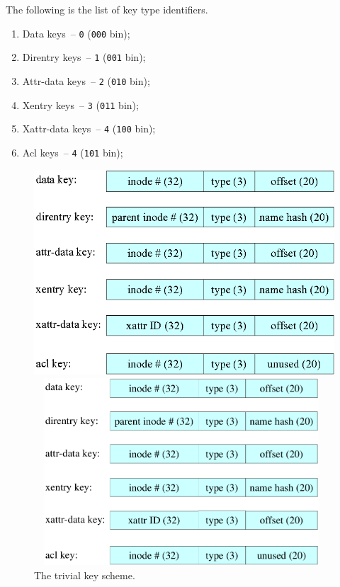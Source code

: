 The following is the list of key type identifiers.

\begin{enumerate}

\item Data keys~-- \texttt{0} (\texttt{000} bin);
\item Direntry keys~-- \texttt{1} (\texttt{001} bin);
\item Attr-data keys~-- \texttt{2} (\texttt{010} bin);
\item Xentry keys~-- \texttt{3} (\texttt{011} bin);
\item Xattr-data keys~-- \texttt{4} (\texttt{100} bin);
\item Acl keys~-- \texttt{4} (\texttt{101} bin);

\end{enumerate}

%
%
\begin{figure}[h]
\begin{center}
\begin{htmlonly}
\includegraphics{pics/trivkey-01.png}
\end{htmlonly}
\includegraphics[width=110mm,height=70mm]{pics/trivkey-01.pdf}
\end{center}
\caption{The trivial key scheme.}
\label{ref_FigureTrivKey}
\end{figure}

